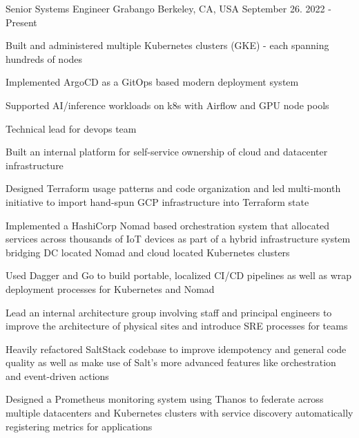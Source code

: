 

\begin{cventries}

  \cventry
    {Senior Systems Engineer} %
    {Grabango} %
    {Berkeley, CA, USA} %
    {September 26. 2022 - Present} %
    {
      \begin{cvitems} %
        \item {Built and administered multiple Kubernetes clusters (GKE) - each spanning hundreds of nodes}
        \item {Implemented ArgoCD as a GitOps based modern deployment system}
        \item {Supported AI/inference workloads on k8s with Airflow and GPU node pools}
        \item {Technical lead for devops team}
        \item {Built an internal platform for self-service ownership of cloud and datacenter infrastructure}
        \item {Designed Terraform usage patterns and code organization and led multi-month initiative to import hand-spun GCP infrastructure into Terraform state}
        \item {Implemented a HashiCorp Nomad based orchestration system that allocated services across thousands of IoT devices as part of a hybrid infrastructure system bridging DC located Nomad and cloud located Kubernetes clusters}
        \item {Used Dagger and Go to build portable, localized CI/CD pipelines as well as wrap deployment processes for Kubernetes and Nomad}
        \item {Lead an internal architecture group involving staff and principal engineers to improve the architecture of physical sites and introduce SRE processes for teams}
        \item {Heavily refactored SaltStack codebase to improve idempotency and general code quality as well as make use of Salt's more advanced features like orchestration and event-driven actions}
        \item {Designed a Prometheus monitoring system using Thanos to federate across multiple datacenters and Kubernetes clusters with service discovery automatically registering metrics for applications}

\end{cvitems}}
\end{cventries}
